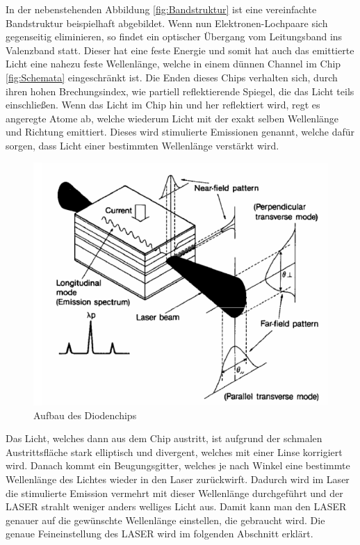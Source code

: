 In der nebenstehenden Abbildung \eqref{fig:Bandstruktur} ist eine vereinfachte Bandstruktur beispielhaft abgebildet. 
Wenn nun Elektronen-Lochpaare sich gegenseitig eliminieren, so findet ein optischer Übergang vom Leitungsband ins Valenzband statt. 
Dieser hat eine feste Energie und somit hat auch das emittierte Licht eine nahezu feste Wellenlänge, 
welche in einem dünnen Channel im Chip \eqref{fig:Schemata} eingeschränkt ist. 
Die Enden dieses Chips verhalten sich, durch ihren hohen Brechungsindex, wie partiell reflektierende Spiegel, die das Licht teils einschließen. 
Wenn das Licht im Chip hin und her reflektiert wird, regt es angeregte Atome ab, welche wiederum Licht mit der exakt selben Wellenlänge und Richtung emittiert. 
Dieses wird stimulierte Emissionen genannt, welche dafür sorgen, dass Licht einer bestimmten Wellenlänge verstärkt wird.  

\begin{figure}[H]
    \centering
    \includegraphics[width=\textwidth]{Bilder/Schemata.png} 
    \caption{Aufbau des Diodenchips \cite{man:v60}}
    \label{fig:Schemata}
\end{figure}

Das Licht, welches dann aus dem Chip austritt, ist aufgrund der schmalen Austrittsfläche stark elliptisch und divergent, welches mit einer Linse korrigiert wird. 
Danach kommt ein Beugungsgitter, welches je nach Winkel eine bestimmte Wellenlänge des Lichtes wieder in den Laser zurückwirft. 
Dadurch wird im Laser die stimulierte Emission vermehrt mit dieser Wellenlänge durchgeführt und der LASER strahlt weniger anders welliges Licht aus.
Damit kann man den LASER genauer auf die gewünschte Wellenlänge einstellen, die gebraucht wird. 
Die genaue Feineinstellung des LASER wird im folgenden Abschnitt erklärt. 

